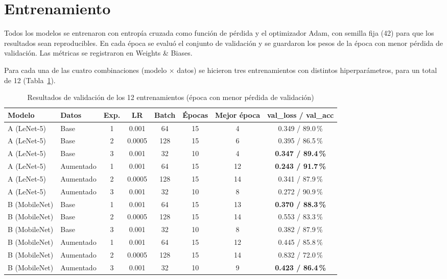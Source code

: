 \documentclass[conference]{IEEEtran}
\begin{document}
\section{Entrenamiento}
Todos los modelos se entrenaron con entropía cruzada como función de pérdida y el optimizador Adam, con semilla fija (42) para que los resultados sean reproducibles. En cada época se evaluó el conjunto de validación y se guardaron los pesos de la época con menor pérdida de validación. Las métricas se registraron en Weights \& Biases.

Para cada una de las cuatro combinaciones (modelo $\times$ datos) se hicieron tres entrenamientos con distintos hiperparámetros, para un total de 12 (Tabla~\ref{tab:corridas}).

\begin{table}[htbp]
\caption{Resultados de validación de los 12 entrenamientos (época con menor pérdida de validación)}
\label{tab:corridas}
\centering
\begin{tabular}{llcccccc}
\toprule
Modelo & Datos & Exp. & LR & Batch & Épocas & Mejor época & val\_loss / val\_acc \\
\midrule
A (LeNet-5)   & Base       & 1 & 0.001  & 64  & 15 & 4  & 0.349 / 89.0\,\% \\
A (LeNet-5)   & Base       & 2 & 0.0005 & 128 & 15 & 6  & 0.395 / 86.5\,\% \\
A (LeNet-5)   & Base       & 3 & 0.001  & 32  & 10 & 4  & \textbf{0.347 / 89.4\,\%} \\
\midrule
A (LeNet-5)   & Aumentado  & 1 & 0.001  & 64  & 15 & 12 & \textbf{0.243 / 91.7\,\%} \\
A (LeNet-5)   & Aumentado  & 2 & 0.0005 & 128 & 15 & 14 & 0.341 / 87.9\,\% \\
A (LeNet-5)   & Aumentado  & 3 & 0.001  & 32  & 10 & 8  & 0.272 / 90.9\,\% \\
\midrule
B (MobileNet) & Base       & 1 & 0.001  & 64  & 15 & 13 & \textbf{0.370 / 88.3\,\%} \\
B (MobileNet) & Base       & 2 & 0.0005 & 128 & 15 & 14 & 0.553 / 83.3\,\% \\
B (MobileNet) & Base       & 3 & 0.001  & 32  & 10 & 8  & 0.382 / 87.9\,\% \\
\midrule
B (MobileNet) & Aumentado  & 1 & 0.001  & 64  & 15 & 12 & 0.445 / 85.8\,\% \\
B (MobileNet) & Aumentado  & 2 & 0.0005 & 128 & 15 & 14 & 0.832 / 72.0\,\% \\
B (MobileNet) & Aumentado  & 3 & 0.001  & 32  & 10 & 9  & \textbf{0.423 / 86.4\,\%} \\
\bottomrule
\end{tabular}
\end{table}
\end{document}
